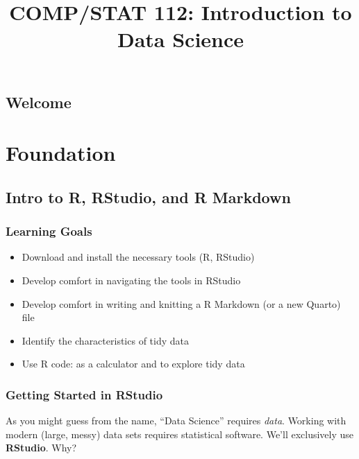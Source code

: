 \documentclass[
  letterpaper,
  DIV=11,
  numbers=noendperiod]{scrreprt}
\title{COMP/STAT 112: Introduction to Data Science}
\author{}
\date{}
\providecommand{\tightlist}{%
  \setlength{\itemsep}{0pt}\setlength{\parskip}{0pt}}\usepackage{longtable,booktabs,array}
\renewcommand*\contentsname{Table of contents}
\newcommand\contentsname{Table of contents}
\begin{document}
\maketitle

\renewcommand*\contentsname{Table of contents}
{
\hypersetup{linkcolor=}
\setcounter{tocdepth}{2}
\tableofcontents
}

\chapter*{Welcome}\label{welcome}


\part{Foundation}

\chapter{Intro to R, RStudio, and R
Markdown}\label{intro-to-r-rstudio-and-r-markdown}

\section{Learning Goals}\label{learning-goals}

\begin{itemize}
\tightlist
\item
  Download and install the necessary tools (R, RStudio)
\item
  Develop comfort in navigating the tools in RStudio
\item
  Develop comfort in writing and knitting a R Markdown (or a new Quarto)
  file
\item
  Identify the characteristics of tidy data
\item
  Use R code: as a calculator and to explore tidy data
\end{itemize}

\section{Getting Started in RStudio}\label{getting-started-in-rstudio}

As you might guess from the name, ``Data Science'' requires \emph{data}.
Working with modern (large, messy) data sets requires statistical
software. We'll exclusively use \textbf{RStudio}. Why?
\end{document}
